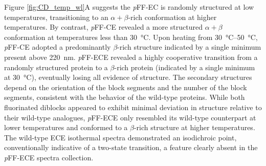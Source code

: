 \begin{refsection}
Figure \ref{fig:CD_temp_wl}A suggests the \emph{p}FF-EC is randomly structured
at low temperatures, transitioning to an ${\alpha+\beta}$-rich conformation  at
higher temperatures. By contrast, \emph{p}FF-CE revealed a more structured
${\alpha+\beta}$ conformation at temperatures less than \SI{30}{\celsius}. Upon
heating from \SIrange{30}{50}{\celsius}, \emph{p}FF-CE adopted a predominantly
${\beta}$-rich structure indicated by a single minimum present above
\SI{220}{\nm}. \emph{p}FF-ECE revealed a highly cooperative transition from a
randomly structured protein to a ${\beta}$-rich protein (indicated by a single
minimum at \SI{30}{\celsius}), eventually losing all evidence of structure. The
secondary structures depend on the orientation of the block segments and the
number of the block segments, consistent with the behavior of the wild-type 
proteins.\cite{Haghpanah2009} While both fluorinated diblocks appeared to
exhibit minimal deviation in structure relative to their wild-type analogues,
\emph{p}FF-ECE only resembled its wild-type counterpart at lower temperatures and
conformed to a ${\beta}$-rich structure at higher temperatures. The wild-type
ECE isothermal spectra demonstrated an isodichroic point, conventionally indicative of a
two-state transition, a feature clearly absent in the \emph{p}FF-ECE spectra
collection.


\end{refsection}
